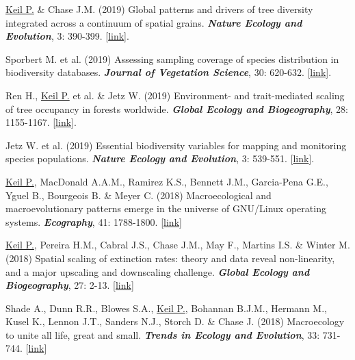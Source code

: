 \begin{etaremune}
\item \underline{Keil P.} \& Chase J.M. (2019) Global patterns and drivers of tree diversity integrated across a continuum of spatial grains. \textit{\textbf{Nature Ecology and Evolution}}, 3: 390-399. [\href{https://www.nature.com/articles/s41559-019-0799-0}{link}].

\item Sporbert M. et al. (2019) Assessing sampling coverage of species distribution in biodiversity databases. \textit{\textbf{Journal of Vegetation Science}}, 30: 620-632. [\href{https://onlinelibrary.wiley.com/doi/full/10.1111/jvs.12763}{link}].

\item Ren H., \underline{Keil P.} et al. \& Jetz W. (2019) Environment- and trait-mediated scaling of tree occupancy in forests worldwide. \textit{\textbf{Global Ecology and Biogeography}}, 28: 1155-1167. [\href{https://onlinelibrary.wiley.com/doi/full/10.1111/geb.12922}{link}].

\item Jetz W. et al. (2019) Essential biodiversity variables for mapping and monitoring species populations. \textit{\textbf{Nature Ecology and Evolution}}, 3: 539-551. [\href{https://www.nature.com/articles/s41559-019-0826-1}{link}].

\item \underline{Keil P.}, MacDonald A.A.M., Ramirez K.S., Bennett J.M., Garcia-Pena G.E., Yguel B., Bourgeois B. \& Meyer C. (2018)  Macroecological and macroevolutionary patterns emerge in the universe of GNU/Linux operating systems. \textit{\textbf{Ecography}}, 41: 1788-1800. [\href{https://onlinelibrary.wiley.com/doi/full/10.1111/ecog.03424}{link}]

\item \underline{Keil P.}, Pereira H.M., Cabral J.S., Chase J.M., May F., Martins I.S. \& Winter M. (2018) Spatial scaling of extinction rates: theory and data reveal non-linearity, and a major upscaling and downscaling challenge. \textit{\textbf{Global Ecology and Biogeography}}, 27: 2-13. [\href{http://onlinelibrary.wiley.com/doi/10.1111/geb.12669/abstract}{link}]

\item Shade A., Dunn R.R., Blowes S.A., \underline{Keil P.}, Bohannan B.J.M., Hermann M., Kusel K., Lennon J.T., Sanders N.J., Storch D. \& Chase J. (2018) Macroecology to unite all life, great and small. \textit{\textbf{Trends in Ecology and Evolution}}, 33: 731-744. [\href{https://www.sciencedirect.com/science/article/pii/S0169534718301861?via%3Dihub}{link}]


\end{etaremune}

